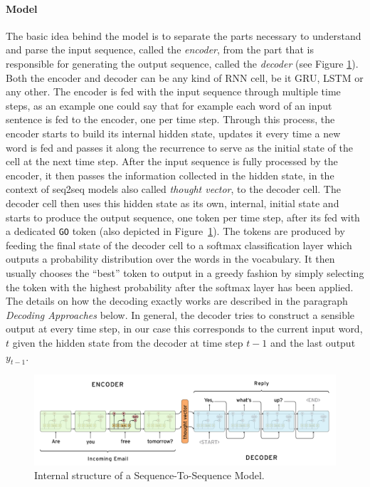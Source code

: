 \paragraph{Model}
The basic idea behind the model is to separate the parts necessary to understand and parse the input sequence, called the \emph{encoder}, from the part that is responsible for generating the output sequence, called the \emph{decoder} (see Figure \ref{fundamentals:seq2seq:internal_structure}). Both the encoder and decoder can be any kind of RNN cell, be it GRU, LSTM or any other. The encoder is fed with the input sequence through multiple time steps, as an example one could say that for example each word of an input sentence is fed to the encoder, one per time step. Through this process, the encoder starts to build its internal hidden state, updates it every time a new word is fed and passes it along the recurrence to serve as the initial state of the cell at the next time step. After the input sequence is fully processed by the encoder, it then passes the information collected in the hidden state, in the context of seq2seq models also called \emph{thought vector}, to the decoder cell. The decoder cell then uses this hidden state as its own, internal, initial state and starts to produce the output sequence, one token per time step, after its fed with a dedicated \texttt{GO} token (also depicted in Figure~\ref{fundamentals:seq2seq:internal_structure}). The tokens are produced by feeding the final state of the decoder cell to a softmax classification layer which outputs a probability distribution over the words in the vocabulary. It then usually chooses the ``best'' token to output in a greedy fashion by simply selecting the token with the highest probability after the softmax layer has been applied. The details on how the decoding exactly works are described in the paragraph \emph{Decoding Approaches} below. In general, the decoder tries to construct a sensible output at every time step, in our case this corresponds to the current input word, $t$ given the hidden state from the decoder at time step $t-1$ and the last output $y_{t-1}$.

\begin{figure}[h]
	\centering
	\includegraphics[width=14cm]{img/seq2seq_internal}
	\caption{Internal structure of a Sequence-To-Sequence Model.\protect\footnotemark}
	\label{fundamentals:seq2seq:internal_structure}
\end{figure}

